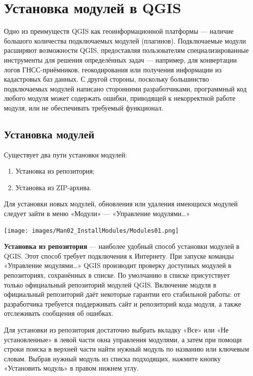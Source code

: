 \documentclass[
  12pt,
]{book}
\begin{document}
\hypertarget{manual-plugins}{%
\chapter{Установка модулей в QGIS}\label{manual-plugins}}

Одно из преимуществ QGIS как геоинформационной платформы --- наличие большого количества подключаемых модулей (плагинов). Подключаемые модули расширяют возможности QGIS, предоставляя пользователям специализированные инструменты для решения определённых задач --- например, для конвертации логов ГНСС-приёмников, геокодирования или получения информации из кадастровых баз данных. С другой стороны, поскольку большинство подключаемых модулей написано сторонними разработчиками, программный код любого модуля может содержать ошибки, приводящей к некорректной работе модуля, или не обеспечивать требуемый функционал.

\hypertarget{manual-plugins-install}{%
\section{Установка модулей}\label{manual-plugins-install}}

Существует два пути установки модулей:

\begin{enumerate}
\def\labelenumi{\arabic{enumi}.}
\item
  Установка из репозитория;
\item
  Установка из ZIP-архива.
\end{enumerate}

Для установки новых модулей, обновления или удаления имеющихся модулей следует зайти в меню «Модули» --- «Управление модулями\ldots»

\texttt{[image: images/Man02\_InstallModules/Modules01.png]}

\textbf{Установка из репозитория} --- наиболее удобный способ установки модулей в QGIS. Этот способ требует подключения к Интернету. При запуске команды «Управление модулями\ldots» QGIS производит проверку доступных модулей в репозиториях, сохранённых в списке. По умолчанию в списке присутствует только официальный репозиторий модулей QGIS. Включение модуля в официальный репозиторий даёт некоторые гарантии его стабильной работы: от разработчика требуется поддерживать сайт и репозиторий кода модуля, а также отслеживать сообщения об ошибках.

Для установки из репозитория достаточно выбрать вкладку «Все» или «Не установленные» в левой части окна управления модулями, а затем при помощи строки поиска в верхней части найти нужный модуль по названию или ключевым словам. Выбрав нужный модуль из списка подходящих, нажмите кнопку «Установить модуль» в правом нижнем углу.
\end{document}
